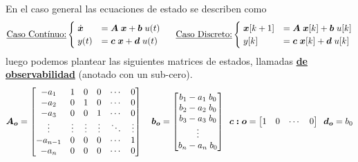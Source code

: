 En el caso general las ecuaciones de estado se describen como
\begin{equation}
    \text{\underline{Caso Contínuo:}}
    \begin{cases}
        \; \dot{\bm{x}} &= \bm{A} \; \bm{x} + \bm{b} \; u(t) \\
        \; y(t) &= \bm{c} \;\bm{x} + \bm{d} \; u(t) \\
    \end{cases}%
    \hspace*{15pt}
    \text{\underline{Caso Discreto:}}    
    \begin{cases}
        \; \bm{x}[k+1] &= \bm{A} \; \bm{x}[k] + \bm{b} \; u[k] \\
        \; y[k] &= \bm{c} \;\bm{x}[k] + \bm{d} \; u[k] \\
    \end{cases}
\end{equation}
luego podemos plantear las siguientes matrices de estados, llamadas \underline{\textbf{de observabilidad}} (anotado con un sub-cero).
\begin{equation*}
    \bm{A_o} = 
    \begin{bmatrix}
    -a_1 & 1 & 0 & 0 & \cdots & 0\\
    -a_2 & 0 & 1 & 0 & \cdots & 0\\
    -a_3 & 0 & 0 & 1 & \cdots & 0\\
    \vdots & \vdots & \vdots & \vdots & \ddots & \vdots \\
    -a_{n-1} & 0 & 0 & 0 & \cdots & 1\\
    -a_{n} & 0 & 0 & 0 & \cdots & 0 \\
    \end{bmatrix}
    \hspace*{10pt}
    \bm{b_o} = 
    \begin{bmatrix}
    b_1 - a_1\; b_0 \\
    b_2 - a_2\; b_0 \\
    b_3 - a_3\; b_0 \\
    \vdots \\
    b_n - a_n\; b_0 \\
    \end{bmatrix}
    \hspace*{5pt}
    \bm{c:o} = 
    \begin{bmatrix}
    1 & 0 & \cdots & 0
    \end{bmatrix}
    \hspace*{5pt}
    \bm{d_o} = b_0
\end{equation*}

